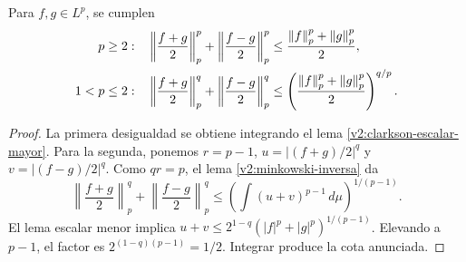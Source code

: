 \begin{teorema}[Clarkson]\label{v2:clarkson}
Para $f,g\in L^p$, se cumplen
\begin{align*}
 p\ge2:&\quad\left\|\frac{f+g}{2}\right\|_p^p+\left\|\frac{f-g}{2}\right\|_p^p
 \le\frac{\left\lVert f\right\rVert_p^p+\left\lVert g\right\rVert_p^p}{2},\\
 1<p\le2:&\quad\left\|\frac{f+g}{2}\right\|_p^q+\left\|\frac{f-g}{2}\right\|_p^q
 \le\left(\frac{\left\lVert f\right\rVert_p^p+\left\lVert g\right\rVert_p^p}{2}\right)^{q/p}.
\end{align*}
\end{teorema}
\begin{proof}
La primera desigualdad se obtiene integrando el lema \ref{v2:clarkson-escalar-mayor}. Para la segunda, ponemos $r=p-1$, $u=|(f+g)/2|^q$ y $v=|(f-g)/2|^q$. Como $qr=p$, el lema \ref{v2:minkowski-inversa} da
\[
 \left\|\frac{f+g}{2}\right\|_p^q+\left\|\frac{f-g}{2}\right\|_p^q
 \le\left(\int(u+v)^{p-1}\,d\mu\right)^{1/(p-1)}.
\]
El lema escalar menor implica $u+v\le2^{1-q}(|f|^p+|g|^p)^{1/(p-1)}$. Elevando a $p-1$, el factor es $2^{(1-q)(p-1)}=1/2$. Integrar produce la cota anunciada.
\end{proof}

